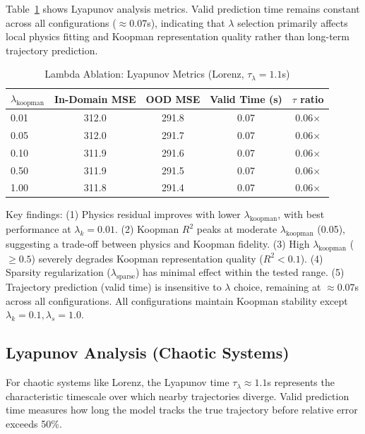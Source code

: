 \documentclass{article}
\theoremstyle{remark}
\begin{document}
Table~\ref{tab:lambda_ablation_lyapunov} shows Lyapunov analysis metrics. Valid prediction time remains constant across all configurations ($\approx 0.07$s), indicating that $\lambda$ selection primarily affects local physics fitting and Koopman representation quality rather than long-term trajectory prediction.

\begin{table}[H]
\centering
\caption{Lambda Ablation: Lyapunov Metrics (Lorenz, $\tau_\lambda = 1.1$s)}
\label{tab:lambda_ablation_lyapunov}
\begin{tabular}{lcccc}
\toprule
$\lambda_\text{koopman}$ & In-Domain MSE & OOD MSE & Valid Time (s) & $\tau$ ratio \\
\midrule
0.01 & 312.0 & 291.8 & 0.07 & 0.06$\times$ \\
0.05 & 312.0 & 291.7 & 0.07 & 0.06$\times$ \\
0.10 & 311.9 & 291.6 & 0.07 & 0.06$\times$ \\
0.50 & 311.9 & 291.5 & 0.07 & 0.06$\times$ \\
1.00 & 311.8 & 291.4 & 0.07 & 0.06$\times$ \\
\bottomrule
\end{tabular}
\end{table}

Key findings: (1) Physics residual improves with lower $\lambda_\text{koopman}$, with best performance at $\lambda_k=0.01$. (2) Koopman $R^2$ peaks at moderate $\lambda_\text{koopman}$ (0.05), suggesting a trade-off between physics and Koopman fidelity. (3) High $\lambda_\text{koopman}$ ($\geq 0.5$) severely degrades Koopman representation quality ($R^2 < 0.1$). (4) Sparsity regularization ($\lambda_\text{sparse}$) has minimal effect within the tested range. (5) Trajectory prediction (valid time) is insensitive to $\lambda$ choice, remaining at $\approx 0.07$s across all configurations. All configurations maintain Koopman stability except $\lambda_k=0.1, \lambda_s=1.0$.

\subsection{Lyapunov Analysis (Chaotic Systems)}

For chaotic systems like Lorenz, the Lyapunov time $\tau_\lambda \approx 1.1$s represents the characteristic timescale over which nearby trajectories diverge. Valid prediction time measures how long the model tracks the true trajectory before relative error exceeds 50\%.
\end{document}
